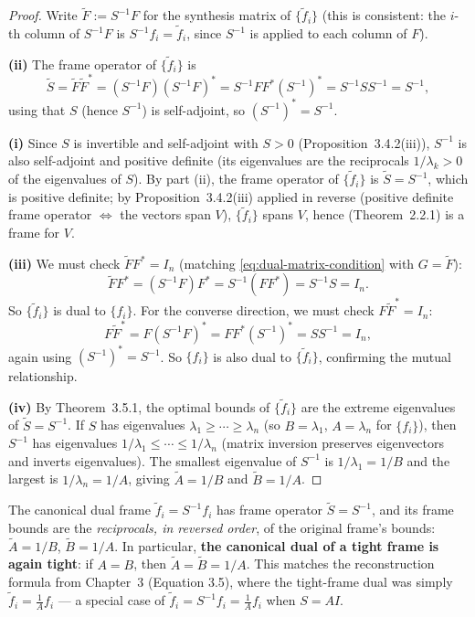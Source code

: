 \begin{proof}
Write $\tilde F := S^{-1}F$ for the synthesis matrix of $\{\tilde
f_i\}$ (this is consistent: the $i$-th column of $S^{-1}F$ is
$S^{-1}f_i=\tilde f_i$, since $S^{-1}$ is applied to each column of $F$).

\textbf{(ii)} The frame operator of $\{\tilde f_i\}$ is
\[
  \tilde S = \tilde F \tilde F^* = (S^{-1}F)(S^{-1}F)^*
  = S^{-1}F F^*(S^{-1})^* = S^{-1}SS^{-1} = S^{-1},
\]
using that $S$ (hence $S^{-1}$) is self-adjoint, so $(S^{-1})^*=S^{-1}$.

\textbf{(i)} Since $S$ is invertible and self-adjoint with $S>0$
(Proposition~3.4.2(iii)), $S^{-1}$ is also self-adjoint and positive
definite (its eigenvalues are the reciprocals $1/\lambda_k>0$ of the
eigenvalues of $S$). By part (ii), the frame operator of
$\{\tilde f_i\}$ is $\tilde S = S^{-1}$, which is positive definite;
by Proposition~3.4.2(iii) applied in reverse (positive definite frame
operator $\Leftrightarrow$ the vectors span $V$), $\{\tilde f_i\}$
spans $V$, hence (Theorem~2.2.1) is a frame for $V$.

\textbf{(iii)} We must check $\tilde F F^* = I_n$ (matching
\eqref{eq:dual-matrix-condition} with $G=\tilde F$):
\[
  \tilde F F^* = (S^{-1}F)F^* = S^{-1}(FF^*) = S^{-1}S = I_n.
\]
So $\{\tilde f_i\}$ is dual to $\{f_i\}$. For the converse direction,
we must check $F\tilde F^* = I_n$:
\[
  F\tilde F^* = F(S^{-1}F)^* = F F^*(S^{-1})^* = S S^{-1} = I_n,
\]
again using $(S^{-1})^*=S^{-1}$. So $\{f_i\}$ is also dual to
$\{\tilde f_i\}$, confirming the mutual relationship.

\textbf{(iv)} By Theorem~3.5.1, the optimal bounds of $\{\tilde f_i\}$
are the extreme eigenvalues of $\tilde S = S^{-1}$. If $S$ has
eigenvalues $\lambda_1\ge\cdots\ge\lambda_n$ (so $B=\lambda_1$,
$A=\lambda_n$ for $\{f_i\}$), then $S^{-1}$ has eigenvalues
$1/\lambda_1\le\cdots\le1/\lambda_n$ (matrix inversion preserves
eigenvectors and inverts eigenvalues). The smallest eigenvalue of
$S^{-1}$ is $1/\lambda_1=1/B$ and the largest is $1/\lambda_n=1/A$,
giving $\tilde A=1/B$ and $\tilde B=1/A$.
\end{proof}

\begin{keyidea}
The canonical dual frame $\tilde f_i = S^{-1}f_i$ has frame operator
$\tilde S = S^{-1}$, and its frame bounds are the \emph{reciprocals,
in reversed order}, of the original frame's bounds: $\tilde A=1/B$,
$\tilde B=1/A$. In particular, \textbf{the canonical dual of a tight
frame is again tight}: if $A=B$, then $\tilde A=\tilde B=1/A$. This matches the reconstruction formula from Chapter~3 (Equation 3.5),
where the tight-frame dual was simply $\tilde f_i =
\tfrac1A f_i$ --- a special case of $\tilde f_i = S^{-1}f_i = \tfrac1A f_i$
when $S=AI$.
\end{keyidea}

